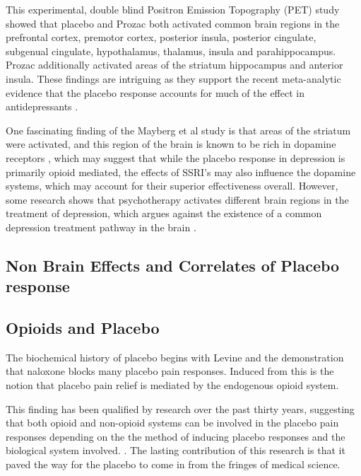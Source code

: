  This experimental, double blind Positron Emission Topography (PET) study showed that placebo and Prozac both activated common brain regions in the prefrontal cortex, premotor cortex, posterior insula, posterior cingulate, subgenual cingulate, hypothalamus, thalamus, insula and parahippocampus. Prozac additionally activated areas of the striatum hippocampus and anterior insula. These findings are intriguing as they support the recent meta-analytic evidence that the placebo response accounts for much of the effect in antidepressants \cite{Kirsch2002a}.

 One fascinating finding of the Mayberg et al study is that areas of the striatum were activated, and this region of the brain is known to be rich in dopamine receptors \cite{DeLaFuente-Fernandez2002}, which may suggest that while the placebo response in depression is primarily opioid mediated, the effects of SSRI's may also influence the dopamine systems, which may account for their superior effectiveness overall. However, some research shows that psychotherapy activates different brain regions in the treatment of depression, which argues against the existence of a common depression treatment pathway in the brain \cite{Benedetti2008}.

\subsection{Non Brain Effects and Correlates of Placebo response}
\label{sec:non-brain-effects}

\subsection{Opioids and Placebo}
\label{sec:opiods-placebo}

The biochemical history of placebo begins with Levine \cite{Levine1978a} and the demonstration that naloxone blocks many placebo pain responses. Induced from this is the notion that placebo pain relief is mediated by the endogenous opioid system. 

This finding has been qualified by research over the past thirty years, suggesting that both opioid and non-opioid systems can be involved in the placebo pain responses depending on the the method of inducing placebo responses and the biological system involved. \cite{Amanzio2001, Benedetti2003a}. The lasting contribution of this research is that it paved the way for the placebo to come in from the fringes of medical science.

